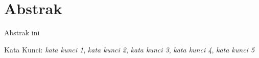 
\chapter*{Abstrak}
\vspace*{0.7cm}

\noindent Abstrak ini\\



\vspace*{0.2cm}

\noindent Kata Kunci: \textit{kata kunci 1}, \textit{kata kunci 2}, \textit{kata kunci 3}, \textit{kata kunci 4}, \textit{kata kunci 5}\\ 

\newpage